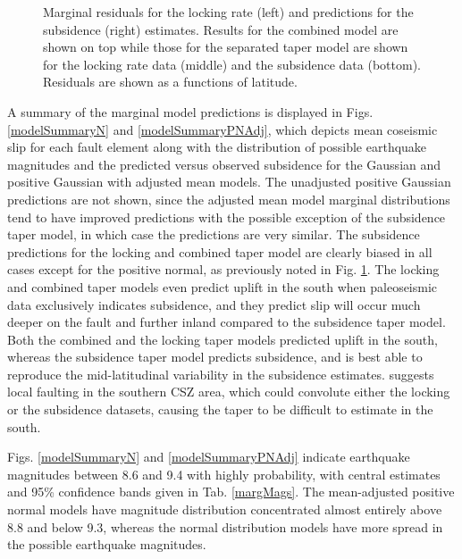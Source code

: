 {\begin{figure}
\centering
{}
\caption{Marginal residuals for the locking rate (left) and predictions for the subsidence (right) estimates.  Results for the combined model are shown on top while those for the separated taper model are shown for the locking rate data (middle) and the subsidence data (bottom).  Residuals are shown as a functions of latitude.}
\label{marginalResiduals}
\end{figure}

A summary of the marginal model predictions is displayed in Figs. \ref{modelSummaryN} and \ref{modelSummaryPNAdj}, which depicts mean coseismic slip for each fault element along with the distribution of possible earthquake magnitudes and the predicted versus observed subsidence for the Gaussian and positive Gaussian with adjusted mean models.  The unadjusted positive Gaussian predictions are not shown, since the adjusted mean model marginal distributions tend to have improved predictions with the possible exception of the subsidence taper model, in which case the predictions are very similar.  The subsidence predictions for the locking and combined taper model are clearly biased in all cases except for the positive normal, as previously noted in Fig. \ref{marginalResiduals}.  The locking and combined taper models even predict uplift in the south when paleoseismic data exclusively indicates subsidence, and they predict slip will occur much deeper on the fault and further inland compared to the subsidence taper model. Both the combined and the locking taper models predicted uplift in the south, whereas the subsidence taper model predicts subsidence, and is best able to reproduce the mid-latitudinal variability in the subsidence estimates.  \citet{clarkeCarver1992} suggests local faulting in the southern CSZ area, which could convolute either the locking or the subsidence datasets, causing the taper to be difficult to estimate in the south.

Figs. \ref{modelSummaryN} and \ref{modelSummaryPNAdj} indicate earthquake magnitudes between 8.6 and 9.4 with highly probability, with central estimates and 95\% confidence bands given in Tab. \ref{margMags}.  The mean-adjusted positive normal models have magnitude distribution concentrated almost entirely above 8.8 and below 9.3, whereas the normal distribution models have more spread in the possible earthquake magnitudes.

}
